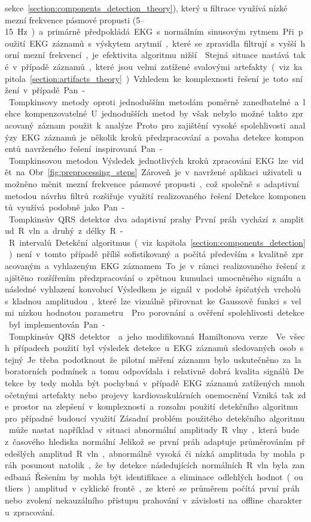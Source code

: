 sekce~\ref{section:components_detection_theory}), který u filtrace využívá nízké
mezní frekvence pásmové propusti (5--15~\si\Hz) a primárně předpokládá EKG s
normálním sinusovým rytmem. Při použití EKG záznamů s výskytem arytmií, které se
zpravidla filtrují s vyšší horní mezní frekvencí, je efektivita algoritmu
nižší~\cite{Fariha2020}. Stejná situace nastává také v případě záznamů, které
jsou velmi zatížené svalovými artefakty (viz
kapitola~\ref{section:artifacts_theory}). Vzhledem ke komplexnosti řešení je
toto snížení v případě Pan-Tompkinsovy metody oproti jednodušším metodám poměrně
zanedbatelné a lehce kompenzovatelné. U jednodušších metod by však nebylo možné
takto zpracovaný záznam použit k analýze. Proto pro zajištění vysoké
spolehlivosti analýzy EKG záznamů je několik kroků předzpracování a povaha
detekce komponentů navrženého řešení inspirovaná Pan-Tompkinsovou metodou.
Výsledek jednotlivých kroků zpracování EKG lze vidět na
Obr.~\ref{fig:preprocessing_steps}. Zároveň je v navržené aplikaci uživateli
umožněno měnit mezní frekvence pásmové propusti, což společně s adaptivní
metodou návrhu filtrů rozšiřuje využití realizovaného řešení. 

Detekce komponentů využívá podobně jako Pan-Tompkinsův QRS detektor dva
adaptivní prahy. První práh vychází z amplitud R vln a druhý z délky R-R
intervalů. Detekční algoritmus (viz kapitola~\ref{section:components_detection})
není v tomto případě příliš sofistikovaný a počítá především s kvalitně
zpracovaným a vyhlazeným EKG záznamem. To je v rámci realizovaného řešení
zajištěno rozšířením předzpracování o zpětnou kumulaci umocněného signálu a
následné vyhlazení konvolucí. Výsledkem je signál v podobě špičatých vrcholů s
kladnou amplitudou, které lze vizuálně přirovnat ke Gaussově funkci s velmi
nízkou hodnotou parametru~\textsigma. Pro porovnání a ověření spolehlivosti
detekce byl implementován Pan-Tompkinsův QRS detektor~\cite{Pan1985} a jeho
modifikovaná Hamiltonova verze~\cite{Hamilton1987}. Ve všech případech použití
byl výsledek detekce u EKG záznamů sledovaných osob stejný. Je třeba podotknout
že pilotní měření záznamu bylo uskutečněno za laboratorních podmínek a tomu
odpovídala i relativně dobrá kvalita signálů. Detekce by tedy mohla být pochybná
v případě EKG záznamů zatížených mnohočetnými artefakty nebo projevy
kardiovaskulárních onemocnění. Vzniká tak zde prostor na zlepšení v komplexnosti
a rozsahu použití detekčního algoritmu pro případné budoucí využití. Zásadní
problém použitého detekčního algoritmu může nastat například v situaci
abnormální amplitudy R vlny, která bude z časového hlediska normální. Jelikož se
první práh adaptuje průměrováním předešlých amplitud R vln, abnormálně vysoká či
nízká amplituda by mohla práh posunout natolik, že by detekce následujících
normálních R vln byla zanedbaná. Řešením by mohla být identifikace a eliminace
odlehlých hodnot (outliers) amplitud v cyklické frontě, ze které se průměrem
počítá první práh nebo zvolení nekauzálního přístupu prahování v závislosti na
offline charakteru zpracování. 

